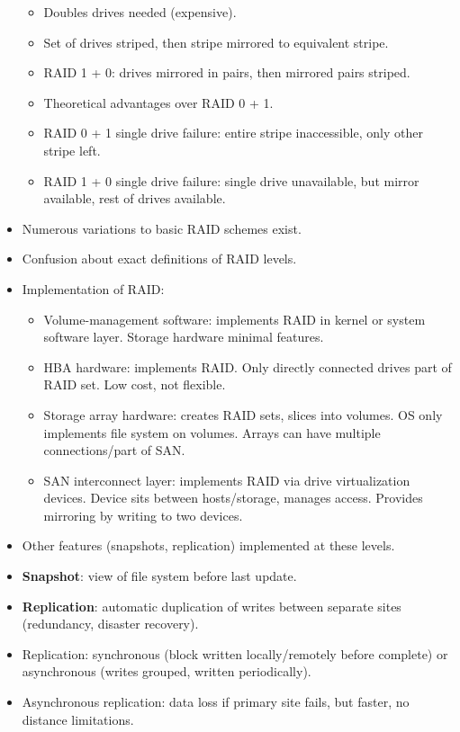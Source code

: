 \begin{itemize}
\begin{itemize}
        \item Doubles drives needed (expensive).
        \item Set of drives striped, then stripe mirrored to equivalent stripe.
        \item RAID 1 + 0: drives mirrored in pairs, then mirrored pairs striped.
        \item Theoretical advantages over RAID 0 + 1.
        \item RAID 0 + 1 single drive failure: entire stripe inaccessible, only other stripe left.
        \item RAID 1 + 0 single drive failure: single drive unavailable, but mirror available, rest of drives available.
    \end{itemize}
    \item Numerous variations to basic RAID schemes exist.
    \item Confusion about exact definitions of RAID levels.
    \item Implementation of RAID:
    \begin{itemize}
        \item Volume-management software: implements RAID in kernel or system software layer. Storage hardware minimal features.
        \item HBA hardware: implements RAID. Only directly connected drives part of RAID set. Low cost, not flexible.
        \item Storage array hardware: creates RAID sets, slices into volumes. OS only implements file system on volumes. Arrays can have multiple connections/part of SAN.
        \item SAN interconnect layer: implements RAID via drive virtualization devices. Device sits between hosts/storage, manages access. Provides mirroring by writing to two devices.
    \end{itemize}
    \item Other features (snapshots, replication) implemented at these levels.
    \item \textbf{Snapshot}: view of file system before last update.
    \item \textbf{Replication}: automatic duplication of writes between separate sites (redundancy, disaster recovery).
    \item Replication: synchronous (block written locally/remotely before complete) or asynchronous (writes grouped, written periodically).
    \item Asynchronous replication: data loss if primary site fails, but faster, no distance limitations.

\end{itemize}
